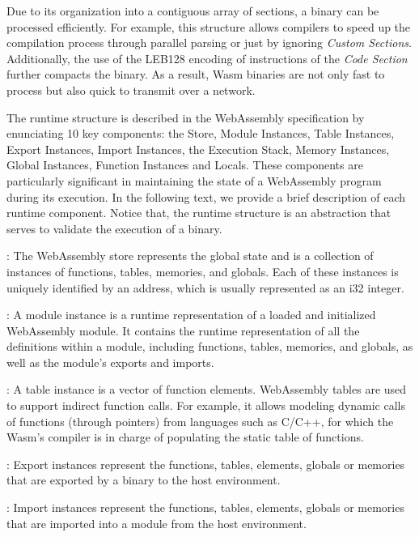 \vspace{2mm}
Due to its organization into a contiguous array of sections, a \wasm binary can be processed efficiently. 
For example, this structure allows compilers to speed up the compilation process through parallel parsing or just by ignoring \emph{Custom Sections}.
Additionally, the use of the LEB128 encoding of instructions of the \emph{Code Section} further compacts the binary. 
As a result, Wasm binaries are not only fast to process but also quick to transmit over a network.

\label{background:wasm:execution}


The \Wasm runtime structure is described in the WebAssembly specification by enunciating 10 key components: the Store, Module Instances,  Table Instances, Export Instances, Import Instances, the Execution Stack, Memory Instances, Global Instances, Function Instances and Locals.  
These components are particularly significant in maintaining the state of a WebAssembly program during its execution. 
In the following text, we provide a brief description of each runtime component.
Notice that, the runtime structure is an abstraction that serves to validate the execution of a \wasm binary.

: The WebAssembly store represents the global state and is a collection of instances of functions, tables, memories, and globals. Each of these instances is uniquely identified by an address, which is usually represented as an i32 integer.


: A module instance is a runtime representation of a loaded and initialized WebAssembly module. 
It contains the runtime representation of all the definitions within a module, including functions, tables, memories, and globals, as well as the module's exports and imports.


: A table instance is a vector of function elements. 
WebAssembly tables are used to support indirect function calls.
For example, it allows modeling dynamic calls of functions (through pointers) from languages such as C/C++, for which the Wasm's compiler is in charge of populating the static table of functions.


: Export instances represent the functions, tables, elements, globals or memories that are exported by a \wasm binary to the host environment. 

: Import instances represent the functions, tables, elements, globals or memories that are imported into a module from the host environment. 

